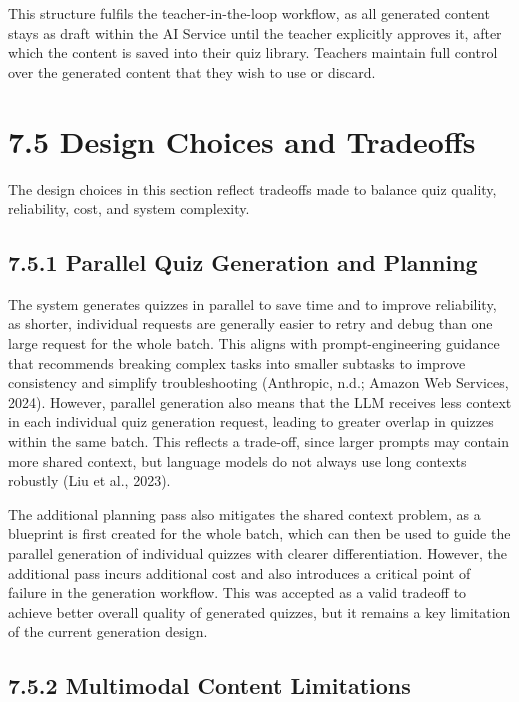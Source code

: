 \documentclass[
  12pt,
  a4paper,
]{report}
\begin{document}
This structure fulfils the teacher-in-the-loop workflow,
as all generated content stays as draft within the AI Service until
the teacher explicitly approves it, after which the content is saved into
their quiz library. Teachers maintain full control over the generated
content that they wish to use or discard.

\hypertarget{design-choices-and-tradeoffs}{%
\section{7.5 Design Choices and Tradeoffs}\label{design-choices-and-tradeoffs}}

The design choices in this section reflect tradeoffs made to balance quiz quality,
reliability, cost, and system complexity.

\subsection{7.5.1 Parallel Quiz Generation and Planning}

The system generates quizzes in parallel to save time and to improve reliability,
as shorter, individual requests are generally easier to retry and debug than one
large request for the whole batch. This aligns with prompt-engineering guidance
that recommends breaking complex tasks into smaller subtasks to improve consistency
and simplify troubleshooting (Anthropic, n.d.; Amazon Web Services, 2024).
However, parallel generation also means that the LLM receives less context in
each individual quiz generation request, leading to greater overlap in quizzes
within the same batch. This reflects a trade-off, since larger prompts may contain
more shared context, but language models do not always use long contexts robustly
(Liu et al., 2023).

The additional planning pass also mitigates the shared context problem, as a blueprint is first created for the whole
batch, which can then be used to guide the parallel generation of individual quizzes
with clearer differentiation. However, the additional pass incurs
additional cost and also introduces a critical point of failure
in the generation workflow. This was accepted as
a valid tradeoff to achieve better overall quality of generated quizzes, but it remains
a key limitation of the current generation design.

\subsection{7.5.2 Multimodal Content Limitations}
\end{document}
